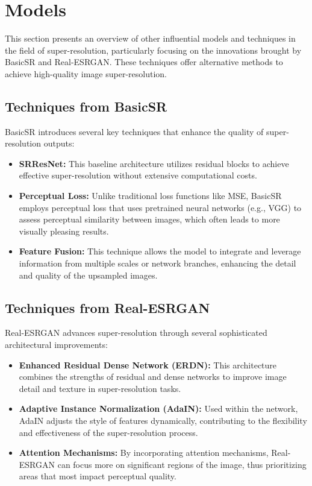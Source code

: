 \section{Models}
\label{sec:Models}%

This section presents an overview of other influential models and techniques in the field of super-resolution, particularly focusing on the innovations brought by BasicSR and Real-ESRGAN. These techniques offer alternative methods to achieve high-quality image super-resolution.

\subsection{Techniques from BasicSR}
\label{subsec:BasicSR}%

BasicSR introduces several key techniques that enhance the quality of super-resolution outputs:

\begin{itemize}
    \item \textbf{SRResNet:} This baseline architecture utilizes residual blocks to achieve effective super-resolution without extensive computational costs.
    \item \textbf{Perceptual Loss:} Unlike traditional loss functions like MSE, BasicSR employs perceptual loss that uses pretrained neural networks (e.g., VGG) to assess perceptual similarity between images, which often leads to more visually pleasing results.
    \item \textbf{Feature Fusion:} This technique allows the model to integrate and leverage information from multiple scales or network branches, enhancing the detail and quality of the upsampled images.
\end{itemize}

\subsection{Techniques from Real-ESRGAN}
\label{subsec:Real-ESRGAN}%

Real-ESRGAN advances super-resolution through several sophisticated architectural improvements:

\begin{itemize}
    \item \textbf{Enhanced Residual Dense Network (ERDN):} This architecture combines the strengths of residual and dense networks to improve image detail and texture in super-resolution tasks.
    \item \textbf{Adaptive Instance Normalization (AdaIN):} Used within the network, AdaIN adjusts the style of features dynamically, contributing to the flexibility and effectiveness of the super-resolution process.
    \item \textbf{Attention Mechanisms:} By incorporating attention mechanisms, Real-ESRGAN can focus more on significant regions of the image, thus prioritizing areas that most impact perceptual quality.
\end{itemize}

